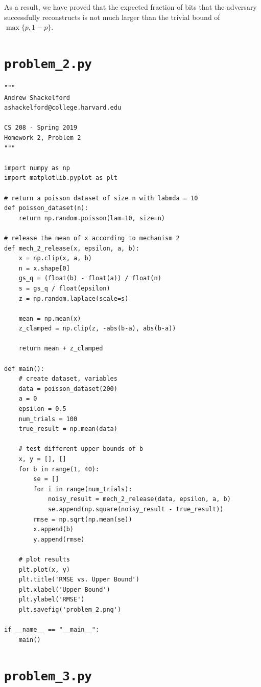 \documentclass[12pt]{article}
\def\cl{\lstinline}
\begin{document}
As a result, we have proved that the expected fraction of bits that the adversary successfully reconstructs is not much larger than the trivial bound of $\max\{p, 1-p\}$.

\newpage

\begin{appendices}

\section{\cl{problem_2.py}}
\label{appendix:problem_2}

\begin{lstlisting}
"""
Andrew Shackelford
ashackelford@college.harvard.edu

CS 208 - Spring 2019
Homework 2, Problem 2
"""

import numpy as np
import matplotlib.pyplot as plt

# return a poisson dataset of size n with labmda = 10
def poisson_dataset(n):
    return np.random.poisson(lam=10, size=n)

# release the mean of x according to mechanism 2
def mech_2_release(x, epsilon, a, b):
    x = np.clip(x, a, b)
    n = x.shape[0]
    gs_q = (float(b) - float(a)) / float(n)
    s = gs_q / float(epsilon)
    z = np.random.laplace(scale=s)

    mean = np.mean(x)
    z_clamped = np.clip(z, -abs(b-a), abs(b-a))

    return mean + z_clamped

def main():
    # create dataset, variables
    data = poisson_dataset(200)
    a = 0
    epsilon = 0.5
    num_trials = 100
    true_result = np.mean(data)

    # test different upper bounds of b
    x, y = [], []
    for b in range(1, 40):
        se = []
        for i in range(num_trials):
            noisy_result = mech_2_release(data, epsilon, a, b)
            se.append(np.square(noisy_result - true_result))
        rmse = np.sqrt(np.mean(se))
        x.append(b)
        y.append(rmse)

    # plot results
    plt.plot(x, y)
    plt.title('RMSE vs. Upper Bound')
    plt.xlabel('Upper Bound')
    plt.ylabel('RMSE')
    plt.savefig('problem_2.png')

if __name__ == "__main__":
    main()
\end{lstlisting}

\newpage

\section{\cl{problem_3.py}}
\label{appendix:problem_3}


\end{appendices}
\end{document}
